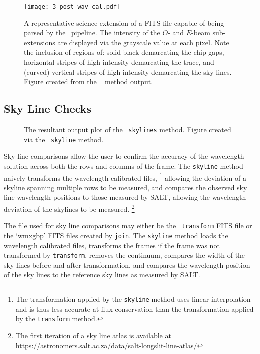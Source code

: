 \begin{figure}[t]
    \centering
    \texttt{[image: 3\_post\_wav\_cal.pdf]}
    \caption{A representative science extension of a \gls{FITS} file capable of being parsed by the \polsalt\ pipeline. The intensity of the $O$- and $E$-beam sub-extensions are displayed via the grayscale value at each pixel. Note the inclusion of regions of: solid black demarcating the chip gaps, horizontal stripes of high intensity demarcating the trace, and (curved) vertical stripes of high intensity demarcating the sky lines. Figure created from the \stops\  method output.}
    \label{fig:polsalt_post_wav_cal}
\end{figure}

\subsection{Sky Line Checks} \label{subsec:stops_skyline}



\begin{figure}[t]
    \centering
    \caption{The resultant output plot of the \stops\ \texttt{skylines} method. Figure created via the \stops\ \texttt{skyline} method.}
    \label{fig:stops_sky_eg}
\end{figure}

Sky line comparisons allow the user to confirm the accuracy of the wavelength solution across both the rows and columns of the frame. The \texttt{skyline} method naively transforms the wavelength calibrated files,%
\footnote{The transformation applied by the \texttt{skyline} method uses linear interpolation and is thus less accurate at flux conservation than the transformation applied by the \texttt{transform} method.}
allowing the deviation of a skyline spanning multiple rows to be measured, and compares the observed sky line wavelength positions to those measured by \gls{SALT}, allowing the wavelength deviation of the skylines to be measured.%
\footnote{The first iteration of a sky line atlas is available at \url{https://astronomers.salt.ac.za/data/salt-longslit-line-atlas/}}

The file used for sky line comparisons may either be the \iraf\ \texttt{transform} \gls{FITS} file or the `wmxgbp' \gls{FITS} files created by \texttt{join}. The \texttt{skyline} method loads the wavelength calibrated files, transforms the frames if the frame was not transformed by \texttt{transform}, removes the continuum, compares the width of the sky lines before and after transformation, and compares the wavelength position of the sky lines to the reference sky lines as measured by \gls{SALT}.

